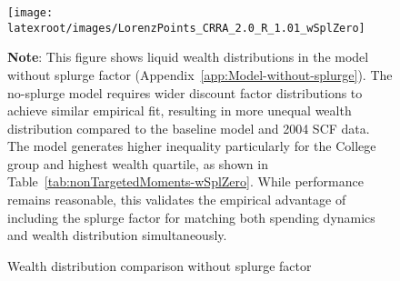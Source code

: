\documentclass{econsocart}
\begin{document}
\begin{figure}[htb] 
  \centering
  \caption{Wealth distribution comparison without splurge factor}
  \label{fig:LorenzPtsSplZero} 
  \texttt{[image: \\latexroot/images/LorenzPoints\_CRRA\_2.0\_R\_1.01\_wSplZero]}

  \medskip
  \noindent\parbox{\textwidth}{\footnotesize
    \textbf{Note}: This figure shows liquid wealth distributions in the model without splurge factor (Appendix~\ref{app:Model-without-splurge}).
    The no-splurge model requires wider discount factor distributions to achieve similar empirical fit,
    resulting in more unequal wealth distribution compared to the baseline model and 2004 SCF data.
    The model generates higher inequality particularly for the College group and highest wealth quartile,
    as shown in Table~\ref{tab:nonTargetedMoments-wSplZero}. While performance remains reasonable,
    this validates the empirical advantage of including the splurge factor for matching both spending
    dynamics and wealth distribution simultaneously.
  }
\end{figure}

\vspace{0.5em}
\end{document}
